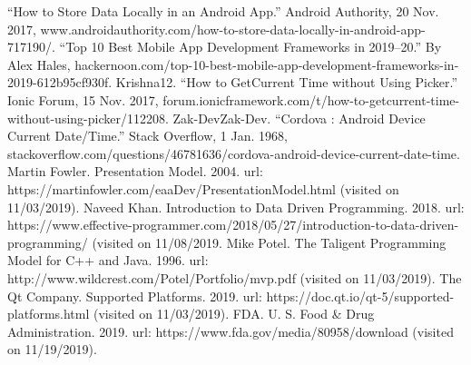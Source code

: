 \documentclass[onecolumn, draftclsnofoot,10pt, compsoc]{IEEEtran}
\begin{document}
“How to Store Data Locally in an Android App.” Android Authority, 20 Nov. 2017, www.androidauthority.com/how-to-store-data-locally-in-android-app-717190/.
\newline
\newline
“Top 10 Best Mobile App Development Frameworks in 2019–20.” By Alex Hales, hackernoon.com/top-10-best-mobile-app-development-frameworks-in-2019-612b95cf930f.
\newline
\newline
Krishna12. “How to GetCurrent Time without Using Picker.” Ionic Forum, 15 Nov. 2017, forum.ionicframework.com/t/how-to-getcurrent-time-without-using-picker/112208.
\newline
\newline
Zak-DevZak-Dev. “Cordova : Android Device Current Date/Time.” Stack Overflow, 1 Jan. 1968, stackoverflow.com/questions/46781636/cordova-android-device-current-date-time.
\newline
\newline
 Martin Fowler. Presentation Model. 2004. url: https://martinfowler.com/eaaDev/PresentationModel.html (visited on 11/03/2019).
\newline
\newline
 Naveed Khan. Introduction to Data Driven Programming. 2018. url: https://www.effective-programmer.com/2018/05/27/introduction-to-data-driven-programming/ (visited on 11/08/2019.
\newline
\newline
 Mike Potel. The Taligent Programming Model for C++ and Java. 1996. url: http://www.wildcrest.com/Potel/Portfolio/mvp.pdf (visited on 11/03/2019).
\newline
\newline
The Qt Company. Supported Platforms. 2019. url: https://doc.qt.io/qt-5/supported-platforms.html (visited on 11/03/2019).
\newline
\newline
FDA. U. S. Food \& Drug Administration. 2019. url: https://www.fda.gov/media/80958/download (visited on 11/19/2019).
\end{document}
